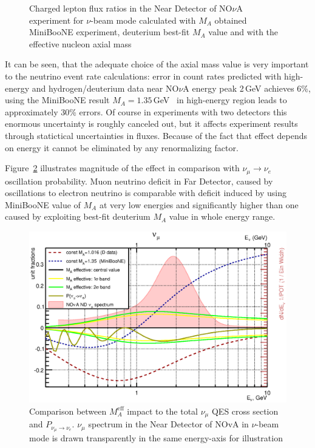 \begin{figure}[htb!]
\begin{center}
\caption{\label{NOvArates}Charged lepton flux ratios in the Near Detector of NO$\nu$A experiment for $\nu$-beam mode calculated with $M_{A}$ obtained MiniBooNE experiment, deuterium best-fit $M_{A}$ value and with the effective nucleon axial mass}
\end{center}
\end{figure}

It can be seen, that the adequate choice of the axial mass value is very important to the neutrino event rate calculations: error in count rates predicted with high-energy and hydrogen/deuterium data near NO$\nu$A energy peak 2\,GeV achieves 6\%, using the MiniBooNE result $M_{A}=1.35$\,GeV~\cite{AguilarArevalo:2010zc} in high-energy region leads to approximately 30\% errors. Of course in experiments with two detectors this enormous uncertainty is roughly canceled out, but it affects experiment results through statictical uncertainties in fluxes. Because of the fact that effect depends on energy it cannot be eliminated by any renormalizing factor.

Figure~\ref{NOvAeffect} illustrates magnitude of the effect in comparison with $\nu_{\mu}\to{}\nu_{e}$ oscillation probability. Muon neutrino deficit in Far Detector, caused by oscillations to electron neutrino is comparable with deficit induced by using MiniBooNE value of $M_{A}$ at very low energies and significantly higher than one caused by exploiting best-fit deuterium $M_{A}$ value in whole energy range.

\begin{figure}[htb!]
\includegraphics[width=\columnwidth]{./NOvA/Scintillator_nm_n5.eps}
\caption{\label{NOvAeffect}Comparison between $M_{A}^{\mathrm{eff}}$ impact to the total $\nu_{\mu}$ QES cross section and $P_{\nu_{\mu}\to{}\nu_{e}}$. $\nu_{\mu}$ spectrum in the Near Detector of NOvA in $\nu$-beam mode is drawn transparently in the same energy-axis for illustration}
\end{figure}


